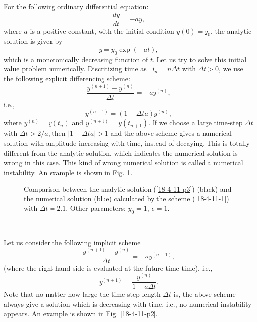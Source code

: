 \documentclass{article}
\begin{document}
For the following ordinary differential equation:
\begin{equation}
  \frac{d y}{d t} = - a y,
\end{equation}
where $a$ is a positive constant, with the initial condition $y (0) = y_0$,
the analytic solution is given by
\begin{equation}
  \label{18-4-11-p3} y = y_0 \exp (- a t),
\end{equation}
which is a monotonically decreasing function of $t$. Let us try to solve this
initial value problem numerically. Discritizing time as \ $t_n = n \Delta t$
with $\Delta t > 0$, we use the following explicit differencing scheme:
\begin{equation}
  \frac{y^{(n + 1)} - y^{(n)}}{\Delta t} = - a y^{(n)},
\end{equation}
i.e.,
\begin{equation}
  \label{18-4-11-1} y^{(n + 1)} = (1 - \Delta t a) y^{(n)},
\end{equation}
where $y^{(n)} = y (t_n)$ and $y^{(n + 1)} = y (t_{n + 1})$. If we choose a
large time-step $\Delta t$ with $\Delta t > 2 / a$, then $| 1 - \Delta t a | >
1$ and the above scheme gives a numerical solution with amplitude increasing
with time, instead of decaying. This is totally different from the analytic
solution, which indicates the numerical solution is wrong in this case. This
kind of wrong numerical solution is called a numerical instability. An example
is shown in Fig. \ref{18-4-11-2}.

\begin{figure}[h]
  \caption{\label{18-4-11-2}Comparison between the analytic solution
  (\ref{18-4-11-p3}) (black) and the numerical solution (blue) calculated by
  the scheme (\ref{18-4-11-1}) with $\Delta t = 2.1$. Other parameters: $y_0 =
  1$, $a = 1$.}
\end{figure}

\

Let us consider the following implicit scheme
\begin{equation}
  \frac{y^{(n + 1)} - y^{(n)}}{\Delta t} = - a y^{(n + 1)},
\end{equation}
(where the right-hand side is evaluated at the future time time), i.e.,
\begin{equation}
  \label{18-4-11-p1} y^{(n + 1)} = \frac{y^{(n)}}{1 + a \Delta t} .
\end{equation}
Note that no matter how large the time step-length $\Delta t$ is, the above
scheme always give a solution which is decreasing with time, i.e., no
numerical instability appears. An example is shown in Fig. \ref{18-4-11-p2}.
\end{document}
